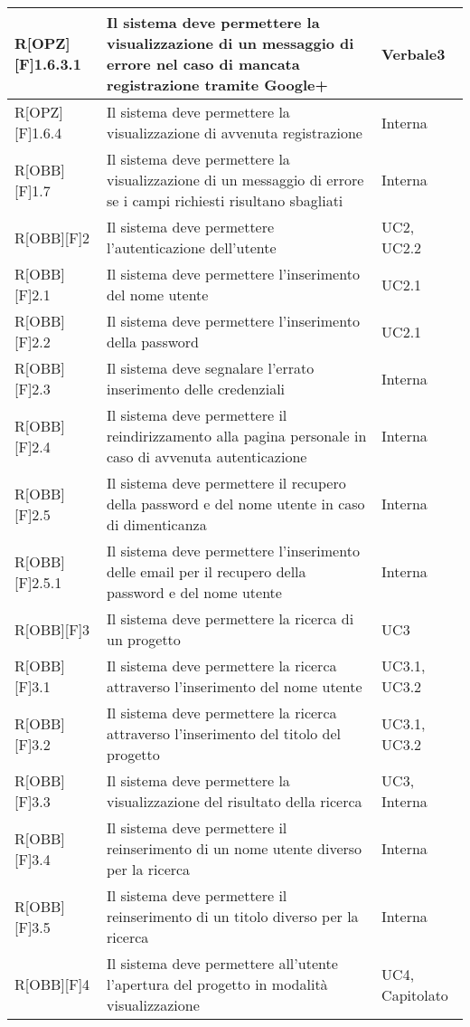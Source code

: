 	\begin{table}[h]
			\begin{tabular}{|p{}|p{}|p{}|}
			\midrule
	
			R[OPZ][F]1.6.3.1 & Il sistema deve permettere la visualizzazione di un messaggio di errore nel caso di mancata registrazione tramite Google+ & Verbale3 \\ \midrule
			R[OPZ][F]1.6.4 & Il sistema deve permettere la visualizzazione di avvenuta registrazione  & Interna \\ \midrule
			R[OBB][F]1.7 & Il sistema deve permettere la visualizzazione di un messaggio di errore se i campi richiesti risultano sbagliati & Interna \\ \midrule
			R[OBB][F]2 & Il sistema deve permettere l'autenticazione dell'utente & UC2, UC2.2 \\ \midrule
			R[OBB][F]2.1 & Il sistema deve permettere l'inserimento del nome utente & UC2.1 \\ \midrule
			R[OBB][F]2.2 & Il sistema deve permettere l'inserimento della password & UC2.1 \\ \midrule
			R[OBB][F]2.3 & Il sistema deve segnalare l'errato inserimento delle credenziali & Interna \\ \midrule
			R[OBB][F]2.4 & Il sistema deve permettere il reindirizzamento alla pagina personale in caso di avvenuta autenticazione & Interna \\ \midrule
			R[OBB][F]2.5 & Il sistema deve permettere il recupero della password e del nome utente in caso di dimenticanza & Interna \\ \midrule
			R[OBB][F]2.5.1 & Il sistema deve permettere l'inserimento delle email per il recupero della password e del nome utente & Interna \\ \midrule
			R[OBB][F]3 & Il sistema deve permettere la ricerca di un progetto  & UC3 \\ \midrule
			R[OBB][F]3.1 & Il sistema deve permettere la ricerca attraverso l'inserimento del nome utente & UC3.1, UC3.2 \\ \midrule
			R[OBB][F]3.2 & Il sistema deve permettere la ricerca attraverso l'inserimento del titolo del progetto & UC3.1, UC3.2 \\ \midrule
			R[OBB][F]3.3 & Il sistema deve permettere la visualizzazione del risultato della ricerca & UC3, Interna \\ \midrule
			R[OBB][F]3.4 & Il sistema deve permettere il reinserimento di un nome utente diverso per la ricerca & Interna \\ \midrule
			R[OBB][F]3.5 & Il sistema deve permettere il reinserimento di un titolo diverso per la ricerca & Interna \\ \midrule
			R[OBB][F]4 & Il sistema deve permettere all'utente l'apertura del progetto in modalità visualizzazione & UC4, Capitolato \\ \midrule

		\end{tabular}
	\end{table}
	\newpage
	
